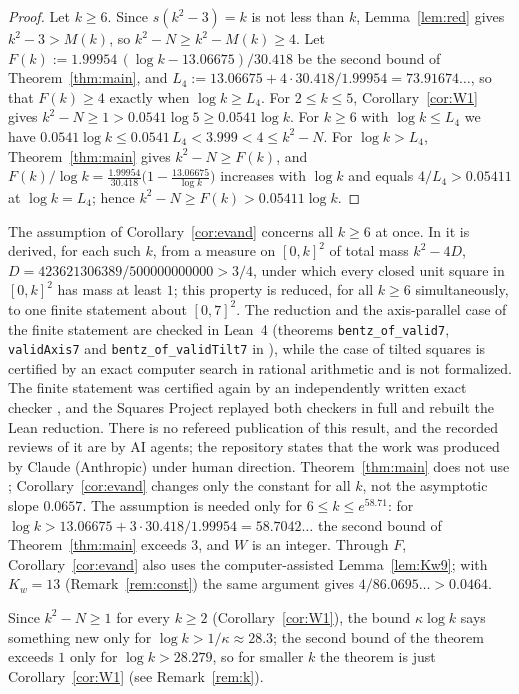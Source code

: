 \documentclass[11pt]{amsart}
\theoremstyle{definition}
\theoremstyle{remark}
\begin{document}
\begin{proof}
Let $k\ge6$. Since $s(k^2-3)=k$ is not less than $k$, Lemma~\ref{lem:red} gives $k^2-3>M(k)$, so $k^2-N\ge k^2-M(k)\ge4$.
Let $F(k):=1.99954\,(\log k-13.06675)/30.418$ be the second bound of Theorem~\ref{thm:main}, and
$L_4:=13.06675+4\cdot30.418/1.99954=73.91674\ldots$, so that $F(k)\ge4$ exactly when $\log k\ge L_4$. For $2\le k\le5$,
Corollary~\ref{cor:W1} gives $k^2-N\ge1>0.0541\log5\ge0.0541\log k$. For $k\ge6$ with $\log k\le L_4$ we have $0.0541\log k\le0.0541\,L_4<3.999<4\le k^2-N$.
For $\log k>L_4$, Theorem~\ref{thm:main} gives $k^2-N\ge F(k)$, and $F(k)/\log k=\frac{1.99954}{30.418}\big(1-\frac{13.06675}{\log k}\big)$
increases with $\log k$ and equals $4/L_4>0.05411$ at $\log k=L_4$; hence $k^2-N\ge F(k)>0.05411\log k$.
\end{proof}

The assumption of Corollary~\ref{cor:evand} concerns all $k\ge6$ at once. In \cite{Dan} it is derived, for each such $k$, from a
measure on $[0,k]^2$ of total mass $k^2-4D$, $D=423621306389/500000000000>3/4$, under which every closed unit square in
$[0,k]^2$ has mass at least $1$; this property is reduced, for all $k\ge6$ simultaneously, to one finite statement about
$[0,7]^2$. The reduction and the axis-parallel case of the finite statement are checked in Lean~4 (theorems
\texttt{bentz\_of\_valid7}, \texttt{validAxis7} and \texttt{bentz\_of\_validTilt7} in \cite{Dan}), while the case of tilted squares is
certified by an exact computer search in rational arithmetic and is not formalized. The finite statement was certified again by an independently written exact
checker \cite{Wan}, and the Squares Project \cite[entry T-064]{Lev} replayed both checkers in full and rebuilt the Lean
reduction. There is no refereed publication of this result, and the recorded reviews of it are by AI agents; the repository
states that the work was produced by Claude (Anthropic) under human direction. Theorem~\ref{thm:main} does not use
\cite{Dan}; Corollary~\ref{cor:evand} changes only the constant for all $k$, not the asymptotic slope $0.0657$. The assumption is
needed only for $6\le k\le e^{58.71}$: for $\log k>13.06675+3\cdot30.418/1.99954=58.7042\ldots$ the second bound of
Theorem~\ref{thm:main} exceeds $3$, and $W$ is an integer. Through $F$, Corollary~\ref{cor:evand} also uses the computer-assisted
Lemma~\ref{lem:Kw9}; with $K_w=13$ (Remark~\ref{rem:const}) the same argument gives $4/86.0695\ldots>0.0464$.

Since $k^2-N\ge1$ for every $k\ge2$ (Corollary~\ref{cor:W1}), the bound $\kappa\log k$ says something new only for
$\log k>1/\kappa\approx28.3$; the second bound of the theorem exceeds $1$ only for $\log k>28.279$, so for smaller $k$ the
theorem is just Corollary~\ref{cor:W1} (see Remark~\ref{rem:k}).
\end{document}
